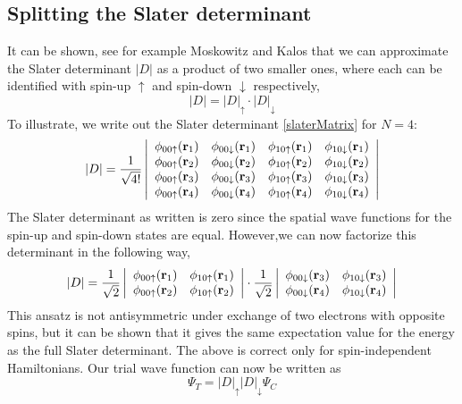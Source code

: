 \documentclass[english, a4paper]{article}
\begin{document}
\subsection{Splitting the Slater determinant}

It can be shown, see for example Moskowitz and Kalos \cite{ref3} that we can approximate the Slater
determinant $|D|$ as a product of two smaller ones, where each can be identified with
spin-up $\uparrow$ and spin-down $\downarrow$ respectively,
\begin{equation}
 |D| = |D|_\uparrow \cdot |D|_\downarrow
\end{equation}
To illustrate, we write out the Slater determinant \eqref{slaterMatrix} for $N=4$:
\begin{equation}
    |D| = \frac{1}{\sqrt{4!}} \left|\begin{array}{cccc}
\phi_{00\uparrow}({\bf r}_1) &\phi_{00\downarrow}({\bf r}_1) 
&\phi_{10\uparrow}({\bf r}_1) &\phi_{10\downarrow}({\bf r}_1) \\
\phi_{00\uparrow}({\bf r}_2) &\phi_{00\downarrow}({\bf r}_2) 
&\phi_{10\uparrow}({\bf r}_2) &\phi_{10\downarrow}({\bf r}_2) \\
\phi_{00\uparrow}({\bf r}_3) &\phi_{00\downarrow}({\bf r}_3) 
&\phi_{10\uparrow}({\bf r}_3) &\phi_{10\downarrow}({\bf r}_3) \\
\phi_{00\uparrow}({\bf r}_4) &\phi_{00\downarrow}({\bf r}_4) 
&\phi_{10\uparrow}({\bf r}_4) &\phi_{10\downarrow}({\bf r}_4) \\
                      \end{array} \right|
\end{equation}
The Slater determinant as written is zero since the spatial wave functions for the
spin-up and spin-down states are equal. 
However,we can now factorize this determinant in the following way,
\begin{equation}
|D| = \frac{1}{\sqrt{2}}\left|\begin{array}{cc}
\phi_{00\uparrow}({\bf r}_1) &\phi_{10\uparrow}({\bf r}_1) \\
\phi_{00\uparrow}({\bf r}_2) &\phi_{10\uparrow}({\bf r}_2) \\
            \end{array} \right|
\cdot
\frac{1}{\sqrt{2}} \left| \begin{array}{cc}
\phi_{00\downarrow}({\bf r}_3) &\phi_{10\downarrow}({\bf r}_3) \\
\phi_{00\downarrow}({\bf r}_4) &\phi_{10\downarrow}({\bf r}_4) \\
       \end{array} \right|
       \label{SlaterDetFactorized}
\end{equation}
This ansatz is not antisymmetric under exchange of two electrons with opposite spins, but it can 
be shown that it gives the same expectation value for the energy as the full Slater determinant. 
The above is correct only for spin-independent Hamiltonians. Our trial wave function
can now be written as
\begin{equation}
 \Psi_T = |D|_\uparrow |D|_\downarrow \Psi_C
 \label{TrialWFSpins}
\end{equation}
\end{document}
